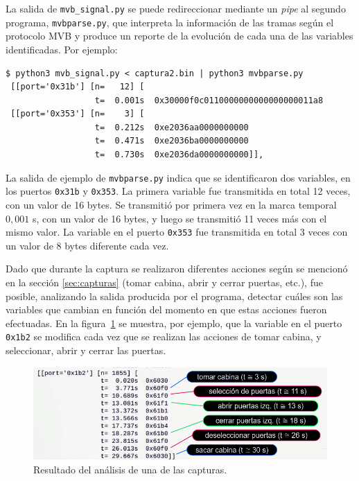 La salida de \texttt{mvb\_signal.py} se puede redireccionar mediante un \textit{pipe} al segundo programa, \texttt{mvbparse.py}, que interpreta la información de las tramas según el protocolo MVB y produce un reporte de la evolución de cada una de las variables identificadas. Por ejemplo:

\begin{lstlisting}[basicstyle=\footnotesize,breaklines=true,backgroundcolor=\color{light-gray}]
$ python3 mvb_signal.py < captura2.bin | python3 mvbparse.py
 [[port='0x31b'] [n=   12] [
                  t=  0.001s  0x30000f0c0110000000000000000011a8
 [[port='0x353'] [n=    3] [
                  t=  0.212s  0xe2036aa0000000000
                  t=  0.471s  0xe2036ba0000000000
                  t=  0.730s  0xe2036da0000000000]],
\end{lstlisting}

La salida de ejemplo de \texttt{mvbparse.py} indica que se identificaron dos variables, en los puertos \texttt{0x31b} y \texttt{0x353}.
La primera variable fue transmitida en total 12 veces, con un valor de 16 bytes. Se transmitió por primera vez en la marca temporal $0{,}001$ s, con un valor de 16 bytes, y luego se transmitió 11 veces más con el mismo valor.
La variable en el puerto \texttt{0x353} fue transmitida en total 3 veces con un valor de 8 bytes diferente cada vez.

Dado que durante la captura se realizaron diferentes acciones según se mencionó en la sección \ref{sec:capturas} (tomar cabina, abrir y cerrar puertas, etc.), fue posible, analizando la salida producida por el programa, detectar cuáles son las variables que cambian en función del momento en que estas acciones fueron efectuadas. En la figura~\ref{fig:analisis-captura} se muestra, por ejemplo, que la variable en el puerto \texttt{0x1b2} se modifica cada vez que se realizan las acciones de tomar cabina, y seleccionar, abrir y cerrar las puertas.

\begin{figure}[htbp]
	\centering
	\includegraphics[width=\textwidth]{./Figures/analisis-captura.png}
	\caption[Resultado del análisis de una de las capturas.]{Resultado del análisis de una de las capturas.}
    \label{fig:analisis-captura}
\end{figure}

